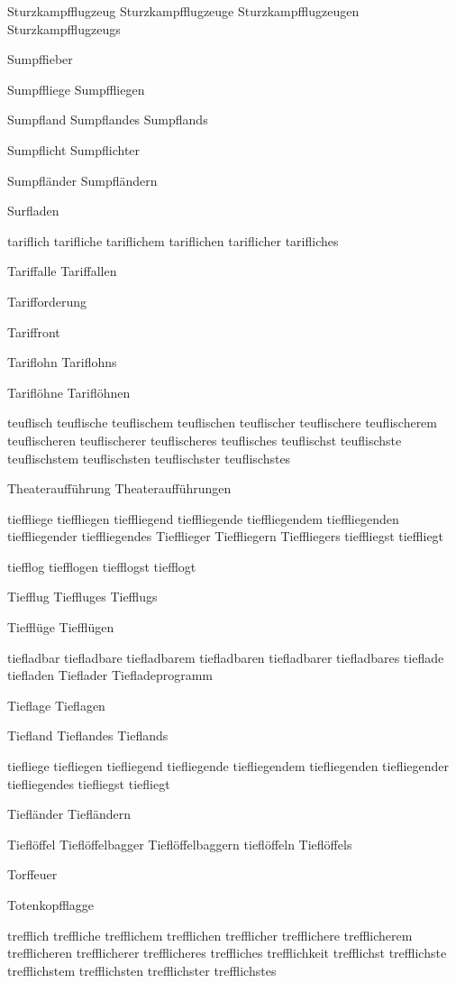 Sturzkampfflugzeug Sturzkampfflugzeuge Sturzkampfflugzeugen Sturzkampfflugzeugs

Sumpffieber

Sumpffliege Sumpffliegen

Sumpfland Sumpflandes Sumpflands

Sumpflicht Sumpflichter

Sumpfländer Sumpfländern

Surfladen

tariflich tarifliche tariflichem tariflichen tariflicher tarifliches

Tariffalle Tariffallen

Tarifforderung

Tariffront

Tariflohn Tariflohns

Tariflöhne Tariflöhnen

teuflisch teuflische teuflischem teuflischen teuflischer teuflischere teuflischerem teuflischeren teuflischerer teuflischeres teuflisches teuflischst teuflischste teuflischstem teuflischsten teuflischster teuflischstes

Theateraufführung Theateraufführungen

tieffliege tieffliegen tieffliegend tieffliegende tieffliegendem tieffliegenden tieffliegender tieffliegendes Tiefflieger Tieffliegern Tieffliegers tieffliegst tieffliegt

tiefflog tiefflogen tiefflogst tiefflogt

Tiefflug Tieffluges Tiefflugs

Tiefflüge Tiefflügen

tiefladbar tiefladbare tiefladbarem tiefladbaren tiefladbarer tiefladbares tieflade tiefladen Tieflader Tiefladeprogramm

Tieflage Tieflagen

Tiefland Tieflandes Tieflands

tiefliege tiefliegen tiefliegend tiefliegende tiefliegendem tiefliegenden tiefliegender tiefliegendes tiefliegst tiefliegt

Tiefländer Tiefländern

Tieflöffel Tieflöffelbagger Tieflöffelbaggern tieflöffeln Tieflöffels

Torffeuer

Totenkopfflagge

trefflich treffliche trefflichem trefflichen trefflicher trefflichere trefflicherem trefflicheren trefflicherer trefflicheres treffliches trefflichkeit trefflichst trefflichste trefflichstem trefflichsten trefflichster trefflichstes

